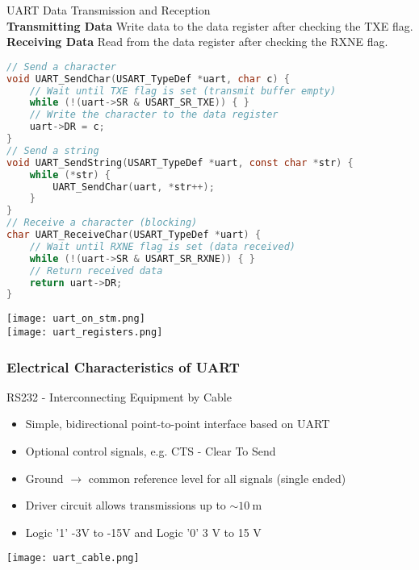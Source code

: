 \begin{KR}{UART Data Transmission and Reception}\\
\textbf{Transmitting Data}
Write data to the data register after checking the TXE flag.\\
\textbf{Receiving Data}
Read from the data register after checking the RXNE flag.

\begin{lstlisting}[language=C, style=basesmol]
// Send a character
void UART_SendChar(USART_TypeDef *uart, char c) {
    // Wait until TXE flag is set (transmit buffer empty)
    while (!(uart->SR & USART_SR_TXE)) { }
    // Write the character to the data register
    uart->DR = c;
}
// Send a string
void UART_SendString(USART_TypeDef *uart, const char *str) {
    while (*str) {
        UART_SendChar(uart, *str++);
    }
}
// Receive a character (blocking)
char UART_ReceiveChar(USART_TypeDef *uart) {
    // Wait until RXNE flag is set (data received)
    while (!(uart->SR & USART_SR_RXNE)) { }
    // Return received data
    return uart->DR;
}
\end{lstlisting}
\end{KR}

\texttt{[image: uart\_on\_stm.png]}
\vspace{2mm}\\
\texttt{[image: uart\_registers.png]}


\raggedcolumns
\pagebreak
\subsubsection{Electrical Characteristics of UART}

\begin{definition}{RS232 - Interconnecting Equipment by Cable}

    \begin{minipage}{0.7\linewidth}
        \begin{itemize}
            \item Simple, bidirectional point-to-point interface based on UART
            \item Optional control signals, e.g. CTS - Clear To Send
            \item Ground $\rightarrow$ common reference level for all signals (single ended)
            \item Driver circuit allows transmissions up to $\sim 10 \mathrm{~m}$
            \item Logic '1' -3V to -15V and Logic '0' 3 V to 15 V
        \end{itemize}
    \end{minipage}
    \begin{minipage}{0.3\linewidth}
    \texttt{[image: uart\_cable.png]}
    \end{minipage}
    
\end{definition}



